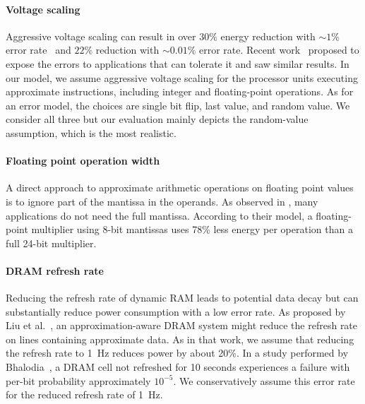 \paragraph{Voltage scaling} Aggressive voltage
scaling can result in over $30\%$ energy reduction with
$\sim \! 1\%$ error rate~\cite{razor} and $22\%$ reduction with
$\sim \! 0.01\%$ error rate.  Recent work~\cite{hpca10cam,relax} proposed to
expose the errors to applications that can tolerate it and saw similar
results. In our model, we assume aggressive voltage scaling for the
processor units executing approximate instructions,
including integer and floating-point operations. As for an
error model, the choices are single bit flip, last value, and random
value. We consider all three but our evaluation mainly depicts the
random-value assumption, which is the most realistic.

\paragraph{Floating point operation width}
A direct approach to approximate arithmetic operations on floating point values
is to ignore part of the mantissa in the operands. As observed in
\cite{bitwidthred}, many applications do not need the full mantissa.
According to their model,
a floating-point multiplier using 8-bit mantissas uses 78\% less
energy per operation than a full 24-bit multiplier.




\paragraph{DRAM refresh rate}
Reducing the refresh rate of dynamic RAM leads to potential data decay
but can substantially reduce power consumption with a low error rate.
As proposed by Liu et al.~\cite{flikker}, an approximation-aware DRAM system
might reduce the refresh rate on lines containing approximate data. As in
that work, we assume that reducing the refresh rate to 1~Hz
reduces power by about 20\%.
In a study performed by Bhalodia~\cite{dramthesis}, a DRAM cell not
refreshed for 10 seconds experiences a failure with per-bit
probability approximately $10^{-5}$. We conservatively assume this error
rate for the reduced refresh rate of 1~Hz.

